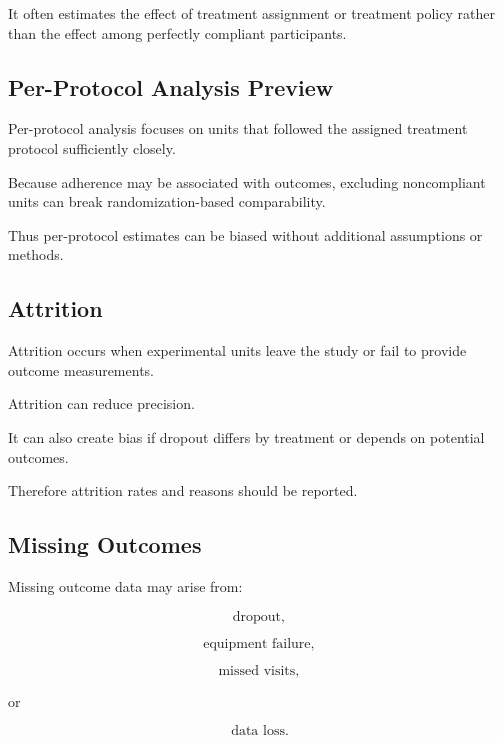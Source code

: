 It often estimates the effect of treatment assignment or treatment
policy rather than the effect among perfectly compliant participants.

\subsection{Per-Protocol Analysis Preview}
\label{subsec:per-protocol-preview}

Per-protocol analysis focuses on units that followed the assigned
treatment protocol sufficiently closely.

Because adherence may be associated with outcomes, excluding
noncompliant units can break randomization-based comparability.

Thus per-protocol estimates can be biased without additional assumptions
or methods.

\subsection{Attrition}
\label{subsec:experimental-attrition}

Attrition occurs when experimental units leave the study or fail to
provide outcome measurements.

Attrition can reduce precision.

It can also create bias if dropout differs by treatment or depends on
potential outcomes.

Therefore attrition rates and reasons should be reported.

\subsection{Missing Outcomes}
\label{subsec:missing-outcomes-design}

Missing outcome data may arise from:

\[
\boxed{
\text{dropout},
}
\]

\[
\boxed{
\text{equipment failure},
}
\]

\[
\boxed{
\text{missed visits},
}
\]

or

\[
\boxed{
\text{data loss}.
}
\]

